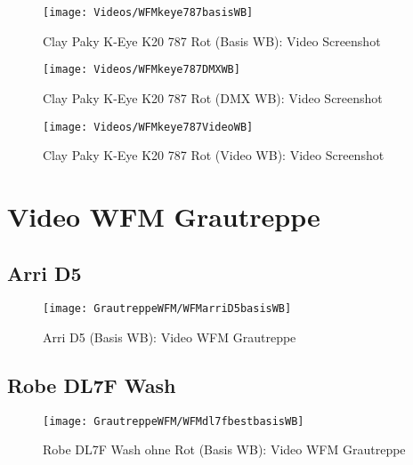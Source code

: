 \documentclass[pagesize,paper=A4,fontsize=12pt,utf8,numbers=noenddot,bibliography=totoc,listof=totoc,DIV=11,BCOR=1mm]{scrreprt}
\begin{document}
\begin{figure}[htp]     %
\centering
\texttt{[image: Videos/WFMkeye787basisWB]} 
\caption {Clay Paky K-Eye K20 787 Rot (Basis WB): Video Screenshot} 
\end{figure}

\begin{figure}[htp]     %
\centering
\texttt{[image: Videos/WFMkeye787DMXWB]} 
\caption {Clay Paky K-Eye K20 787 Rot (DMX WB): Video Screenshot} 
\end{figure}

\begin{figure}[htp]     %
\centering
\texttt{[image: Videos/WFMkeye787VideoWB]} 
\caption {Clay Paky K-Eye K20 787 Rot (Video WB): Video Screenshot} 
\end{figure}


\section{Video WFM Grautreppe}

\subsection{Arri D5}

\begin{figure}[htp]     %
\centering
\texttt{[image: GrautreppeWFM/WFMarriD5basisWB]} 
\caption {Arri D5 (Basis WB): Video WFM Grautreppe} 
\end{figure}

\subsection{Robe DL7F Wash}

\begin{figure}[htp]     %
\centering
\texttt{[image: GrautreppeWFM/WFMdl7fbestbasisWB]} 
\caption {Robe DL7F Wash ohne Rot (Basis WB): Video WFM Grautreppe} 
\end{figure}
\end{document}
